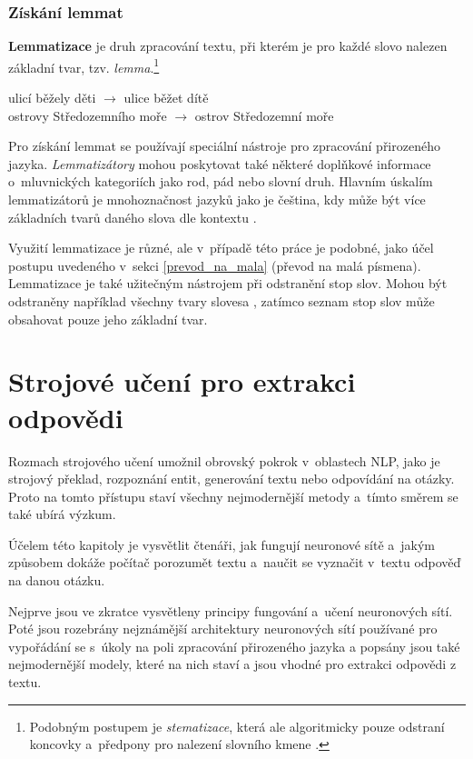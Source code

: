 \subsection{Získání lemmat}
\textbf{Lemmatizace} je druh zpracování textu, při kterém je pro každé slovo nalezen základní tvar, tzv. \emph{lemma}.\footnote{Podobným postupem je \emph{stematizace}, která ale algoritmicky pouze odstraní koncovky a~předpony pro nalezení slovního kmene \cite{information_retrieval}.}
\begin{center}
    ulicí běžely děti $\longrightarrow$ ulice běžet dítě\\
    ostrovy Středozemního moře $\longrightarrow$ ostrov Středozemní moře
\end{center}
Pro získání lemmat se používají speciální nástroje pro zpracování přirozeného jazyka. \emph{Lemma\-tizátory} mohou poskytovat také některé doplňkové informace o~mluvnických kategoriích jako rod, pád nebo slovní druh. Hlavním úskalím lemmatizátorů je mnohoznačnost jazyků jako je čeština, kdy může být více základních tvarů daného slova dle kontextu \cite{information_retrieval}.\par
Využití lemmatizace je různé, ale v~případě této práce je podobné, jako účel postupu uvedeného v~sekci \ref{prevod_na_mala} (převod na malá písmena). Lemmatizace je také užitečným nástrojem při odstranění stop slov. Mohou být odstraněny například všechny tvary slovesa , zatímco seznam stop slov může obsahovat pouze jeho základní tvar.



\chapter{Strojové učení pro extrakci odpovědi}
\label{language_comprehension}

Rozmach strojového učení umožnil obrovský pokrok v~oblastech NLP, jako je strojový překlad, rozpoznání entit, generování textu nebo odpovídání na otázky. Proto na tomto přístupu staví všechny nejmodernější metody a~tímto směrem se také ubírá výzkum.\par
Účelem této kapitoly je vysvětlit čtenáři, jak fungují neuronové sítě a~jakým způsobem dokáže počítač porozumět textu a~naučit se vyznačit v~textu odpověď na danou otázku.\par
Nejprve jsou ve zkratce vysvětleny principy fungování a~učení neuronových sítí. Poté jsou rozebrány nejznámější architektury neuronových sítí používané pro vypořádání se s~úkoly na poli zpracování přirozeného jazyka a popsány jsou také nejmodernější modely, které na nich staví a jsou vhodné pro extrakci odpovědi z textu.
\bigskip

